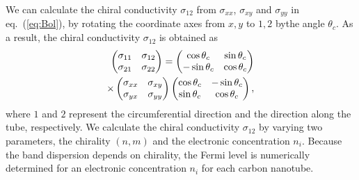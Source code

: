 \documentclass[journal=nalefd,manuscript=article,layout=twocolumn]{achemso}
\begin{document}
We can calculate the chiral conductivity $\sigma_{12}$
from 
 $\sigma_{xx}$, $\sigma_{xy}$ and $\sigma_{yy}$ in eq.~(\ref{eq:Bol}), by
rotating the coordinate axes from $x,y$ to $1,2$ bythe angle $\theta_c$. 
As a result, the chiral conductivity $\sigma_{12}$ is obtained as 
\begin{eqnarray}
\begin{pmatrix}
\sigma_{11} &\sigma_{12} \\
\sigma_{21} & \sigma_{22}
\end{pmatrix}
=
\begin{pmatrix}
\cos \theta_c & \sin\theta_c \cr -\sin \theta_c & \cos \theta_c \cr
\end{pmatrix}
\nonumber \\
\times
\begin{pmatrix}
\sigma_{xx} & \sigma_{xy} \cr \sigma_{yx}& \sigma_{yy} \cr 
\end{pmatrix}
\begin{pmatrix}
\cos \theta_c & -\sin\theta_c \cr \sin \theta_c & \cos \theta_c \cr 
\end{pmatrix}
, \label{eq:sigma1112}
\end{eqnarray}
where $1$ and $2$ represent the circumferential direction and the
 direction along the tube, 
respectively. 
We calculate the chiral conductivity $\sigma_{12}$ by varying
two parameters, the chirality $(n,m)$ and the electronic concentration $n_i$. 
Because the band dispersion depends on chirality, 
the Fermi level is numerically determined for an electronic concentration $n_i$  for each carbon nanotube. 
 
\end{document}
